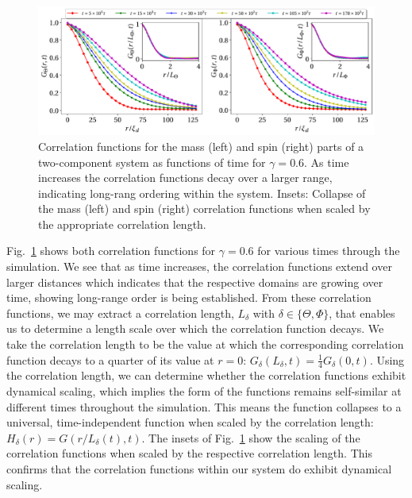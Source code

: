 \begin{figure}
    \centering
    \includegraphics[width=\textwidth]{
        gfx/ch-twoCompDynamics/correlation_functions.pdf}
    \caption[Mass and spin correlation functions associated with half-quantum
    vortex relaxation dynamics]{\label{fig: correlation-functions}Correlation
    functions for the mass (left) and spin (right) parts of a two-component
    system as functions of time for \(\gamma=0.6\).
    As time increases the correlation functions decay over a larger range,
    indicating long-rang ordering within the system.
    Insets: Collapse of the mass (left) and spin (right) correlation functions
    when scaled by the appropriate correlation length.}
\end{figure}
Fig.~\ref{fig: correlation-functions} shows both correlation functions for
\(\gamma=0.6\) for various times through the simulation.
We see that as time increases, the correlation functions extend over larger
distances which indicates that the respective domains are growing over time,
showing long-range order is being established.
From these correlation functions, we may extract a correlation length,
\(L_\delta \) with \(\delta \in \{\Theta, \Phi \} \), that enables us to
determine a length scale over which the correlation function decays.
We take the correlation length to be the value at which the corresponding
correlation function decays to a quarter of its value at
\(r=0\): \(G_\delta(L_\delta, t) = \frac{1}{4}G_\delta(0, t)\).
Using the correlation length, we can determine whether the correlation functions
exhibit dynamical scaling, which implies the form of the functions remains
self-similar at different times throughout the simulation.
This means the function collapses to a universal, time-independent function
when scaled by the correlation length: \(H_\delta(r) = G(r/L_\delta(t), t)\).
The insets of Fig.~\ref{fig: correlation-functions} show the scaling of the
correlation functions when scaled by the respective correlation length.
This confirms that the correlation functions within our system do exhibit
dynamical scaling.

